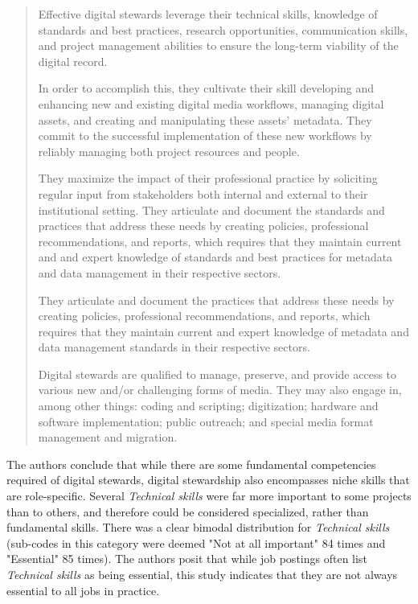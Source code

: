 \documentclass{acm_proc_article-sp}
\begin{document}
\begin{quote}
Effective digital stewards leverage their technical skills, knowledge of standards and best practices, research opportunities, communication skills, and project management abilities to ensure the long-term viability of the digital record.

In order to accomplish this, they cultivate their skill developing and enhancing new and existing digital media workflows, managing digital assets, and creating and manipulating these assets' metadata. They commit to the successful implementation of these new workflows by reliably managing both project resources and people.

They maximize the impact of their professional practice by soliciting regular input from stakeholders both internal and external to their institutional setting. They articulate and document the standards and practices that address these needs by creating policies, professional recommendations, and reports, which requires that they maintain current and and expert knowledge of standards and best practices for metadata and data management in their respective sectors.

They articulate and document the practices that address these needs by creating policies, professional recommendations, and reports, which requires that they maintain current and expert knowledge of metadata and data management standards in their respective sectors.

Digital stewards are qualified to manage, preserve, and provide access to various new and/or challenging forms of media. They may also engage in, among other things: coding and scripting; digitization; hardware and software implementation; public outreach; and special media format management and migration.
\end{quote}

The authors conclude that while there are some fundamental competencies required of digital stewards, digital stewardship also encompasses niche skills that are role-specific. Several \textit{Technical skills} were far more important to some projects than to others, and therefore could be considered specialized, rather than fundamental skills. There was a clear bimodal distribution for \textit{Technical skills} (sub-codes in this category were deemed "Not at all important" 84 times and "Essential" 85 times). The authors posit that while job postings often list \textit{Technical skills} as being essential, this study indicates that they are not always essential to all jobs in practice. 
\end{document}
